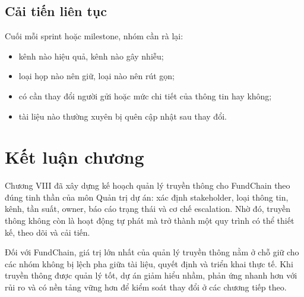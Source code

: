 \subsection{Cải tiến liên tục}

Cuối mỗi sprint hoặc milestone, nhóm cần rà lại:

\begin{itemize}
  \item kênh nào hiệu quả, kênh nào gây nhiễu;
  \item loại họp nào nên giữ, loại nào nên rút gọn;
  \item có cần thay đổi người gửi hoặc mức chi tiết của thông tin hay không;
  \item tài liệu nào thường xuyên bị quên cập nhật sau thay đổi.
\end{itemize}

\fi
\section{Kết luận chương}

Chương VIII đã xây dựng kế hoạch quản lý truyền thông cho FundChain theo đúng tinh thần của môn Quản trị dự án: xác định stakeholder, loại thông tin, kênh, tần suất, owner, báo cáo trạng thái và cơ chế escalation. Nhờ đó, truyền thông không còn là hoạt động tự phát mà trở thành một quy trình có thể thiết kế, theo dõi và cải tiến.

Đối với FundChain, giá trị lớn nhất của quản lý truyền thông nằm ở chỗ giữ cho các nhóm không bị lệch pha giữa tài liệu, quyết định và triển khai thực tế. Khi truyền thông được quản lý tốt, dự án giảm hiểu nhầm, phản ứng nhanh hơn với rủi ro và có nền tảng vững hơn để kiểm soát thay đổi ở các chương tiếp theo.
